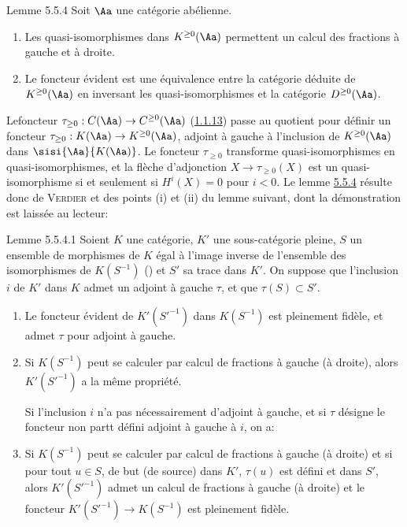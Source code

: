 \documentclass[10pt]{../fichiers-configuration-latex/smfart}
\begin{document}
\begin{enonce*}{Lemme 5.5.4}
Soit $\Aa$ une catégorie abélienne.
\begin{enumerate}
\renewcommand{\theenumi}{\roman{enumi}}
\renewcommand{\labelenumi}{(\theenumi)}
\item Les quasi-isomorphismes dans $K^{\geq 0}(\Aa)$
permettent un calcul des fractions à gauche et à droite.

\item Le foncteur évident est une équivalence entre la catégorie
déduite de $K^{\geq 0}(\Aa)$ en inversant les
quasi-isomorphismes et la catégorie $D^{\geq 0}(\Aa)$.
\end{enumerate}
\end{enonce*}

Le\pageoriginale foncteur $\tau_{\geq 0}:C(\Aa)\rightarrow
C^{\geq 0}(\Aa)$ (\hyperref[XVII.def1.1.13]{1.1.13}) passe au quotient pour définir un
foncteur $\tau_{\geq 0}:K(\Aa)\rightarrow K^{\geq
0}(\Aa)$, adjoint à gauche à l'inclusion de $K^{\geq
0}(\Aa)$ dans $\sisi{\Aa}{K(\Aa)}$. Le foncteur $\tau_{\geq 0}$
transforme quasi-isomorphismes en quasi-isomorphismes, et la flèche
d'adjonction $X\rightarrow \tau_{\geq 0}(X)$ est un quasi-isomorphisme
si et seulement si $H^{i}(X)=0$ pour $i<0$. Le lemme
\hyperref[XVII.lem5.5.4]{5.5.4} résulte
donc de \textsc{Verdier} \cite{SGA4-17:CD} et des points (i) et (ii) du lemme suivant, dont
la démonstration est laissée au lecteur:

\begin{enonce*}{Lemme 5.5.4.1}
Soient $K$ une catégorie, $K'$ une sous-catégorie pleine, $S$ un
ensemble de morphismes de $K$ égal à l'image inverse de l'ensemble des
isomorphismes de $K(S^{-1})$ (\cf \cite[]{SGA4-17:GZ}) et $S'$ sa
trace dans $K'$. On suppose que l'inclusion $i$ de $K'$ dans $K$ admet
un adjoint à gauche $\tau$, et que $\tau(S)\subset S'$.
\begin{enumerate}
\renewcommand{\theenumi}{\roman{enumi}}
\renewcommand{\labelenumi}{(\theenumi)}
\item Le foncteur évident de $K'({S'}^{-1})$ dans $K(S^{-1})$ est
pleinement fidèle, et admet $\tau$ pour adjoint à gauche.

\item Si $K(S^{-1})$ peut se calculer par calcul de fractions à gauche
(\resp à droite), alors $K'({S'}^{-1})$ a la même propriété.

Si l'inclusion $i$ n'a pas nécessairement d'adjoint à gauche, et si
$\tau$ désigne le foncteur non partt défini adjoint à gauche à $i$,
on a:

\item Si $K(S^{-1})$ peut se calculer par calcul de fractions à gauche
(\resp à droite) et si pour tout $u\in S$, de but (\resp de source)
dans $K'$, $\tau(u)$ est défini et dans $S'$, alors $K'({S'}^{-1})$
admet un calcul de fractions à gauche (\resp à droite) et le foncteur
$K'({S'}^{-1})\rightarrow K(S^{-1})$ est pleinement fidèle.
\end{enumerate}
\end{enonce*}
\end{document}
